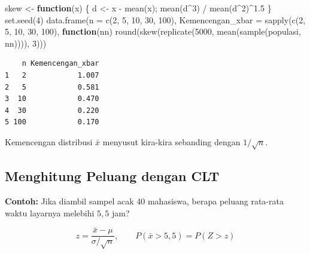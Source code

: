 \documentclass[
  indonesian,
  letterpaper,
]{book}
\newenvironment{Shaded}{\begin{snugshade}}{\end{snugshade}}
\newcommand{\AttributeTok}[1]{\textcolor[rgb]{0.40,0.45,0.13}{#1}}
\newcommand{\ControlFlowTok}[1]{\textcolor[rgb]{0.00,0.23,0.31}{\textbf{#1}}}
\newcommand{\DecValTok}[1]{\textcolor[rgb]{0.68,0.00,0.00}{#1}}
\newcommand{\FloatTok}[1]{\textcolor[rgb]{0.68,0.00,0.00}{#1}}
\newcommand{\FunctionTok}[1]{\textcolor[rgb]{0.28,0.35,0.67}{#1}}
\newcommand{\NormalTok}[1]{\textcolor[rgb]{0.00,0.23,0.31}{#1}}
\newcommand{\OtherTok}[1]{\textcolor[rgb]{0.00,0.23,0.31}{#1}}
\newcommand{\SpecialCharTok}[1]{\textcolor[rgb]{0.37,0.37,0.37}{#1}}
\begin{document}
\begin{Shaded}
\begin{Highlighting}[]
\NormalTok{skew }\OtherTok{\textless{}{-}} \ControlFlowTok{function}\NormalTok{(x) \{ d }\OtherTok{\textless{}{-}}\NormalTok{ x }\SpecialCharTok{{-}} \FunctionTok{mean}\NormalTok{(x); }\FunctionTok{mean}\NormalTok{(d}\SpecialCharTok{\^{}}\DecValTok{3}\NormalTok{) }\SpecialCharTok{/} \FunctionTok{mean}\NormalTok{(d}\SpecialCharTok{\^{}}\DecValTok{2}\NormalTok{)}\SpecialCharTok{\^{}}\FloatTok{1.5}\NormalTok{ \}}
\FunctionTok{set.seed}\NormalTok{(}\DecValTok{4}\NormalTok{)}
\FunctionTok{data.frame}\NormalTok{(}\AttributeTok{n =} \FunctionTok{c}\NormalTok{(}\DecValTok{2}\NormalTok{, }\DecValTok{5}\NormalTok{, }\DecValTok{10}\NormalTok{, }\DecValTok{30}\NormalTok{, }\DecValTok{100}\NormalTok{),}
\AttributeTok{Kemencengan\_xbar =} \FunctionTok{sapply}\NormalTok{(}\FunctionTok{c}\NormalTok{(}\DecValTok{2}\NormalTok{, }\DecValTok{5}\NormalTok{, }\DecValTok{10}\NormalTok{, }\DecValTok{30}\NormalTok{, }\DecValTok{100}\NormalTok{), }\ControlFlowTok{function}\NormalTok{(nn)}
\FunctionTok{round}\NormalTok{(}\FunctionTok{skew}\NormalTok{(}\FunctionTok{replicate}\NormalTok{(}\DecValTok{5000}\NormalTok{, }\FunctionTok{mean}\NormalTok{(}\FunctionTok{sample}\NormalTok{(populasi, nn)))), }\DecValTok{3}\NormalTok{)))}
\end{Highlighting}
\end{Shaded}

\begin{verbatim}
    n Kemencengan_xbar
1   2            1.007
2   5            0.581
3  10            0.470
4  30            0.220
5 100            0.170
\end{verbatim}

Kemencengan distribusi \(\bar{x}\) menyusut kira-kira sebanding dengan
\(1/\sqrt{n}\).

\subsection{Menghitung Peluang dengan
CLT}\label{menghitung-peluang-dengan-clt}

\textbf{Contoh:} Jika diambil sampel acak 40 mahasiswa, berapa peluang
rata-rata waktu layarnya melebihi \(5{,}5\) jam?

\[z = \frac{\bar{x} - \mu}{\sigma / \sqrt{n}}, \qquad P(\bar{x} > 5{,}5) = P(Z > z)\]
\end{document}
